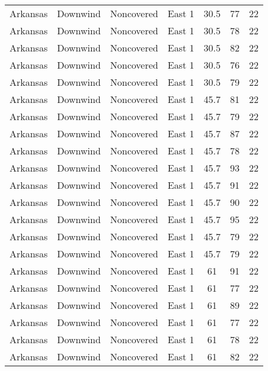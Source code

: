 \documentclass{article}
\begin{document}
\begin{longtable}[H]{ccccccc}
Arkansas & Downwind  & Noncovered & East 1        & 30.5         & 77          & 22  \\
Arkansas & Downwind  & Noncovered & East 1        & 30.5         & 78          & 22  \\
Arkansas & Downwind  & Noncovered & East 1        & 30.5         & 82          & 22  \\
Arkansas & Downwind  & Noncovered & East 1        & 30.5         & 76          & 22  \\
Arkansas & Downwind  & Noncovered & East 1        & 30.5         & 79          & 22  \\
Arkansas & Downwind  & Noncovered & East 1        & 45.7         & 81          & 22  \\
Arkansas & Downwind  & Noncovered & East 1        & 45.7         & 79          & 22  \\
Arkansas & Downwind  & Noncovered & East 1        & 45.7         & 87          & 22  \\
Arkansas & Downwind  & Noncovered & East 1        & 45.7         & 78          & 22  \\
Arkansas & Downwind  & Noncovered & East 1        & 45.7         & 93          & 22  \\
Arkansas & Downwind  & Noncovered & East 1        & 45.7         & 91          & 22  \\
Arkansas & Downwind  & Noncovered & East 1        & 45.7         & 90          & 22  \\
Arkansas & Downwind  & Noncovered & East 1        & 45.7         & 95          & 22  \\
Arkansas & Downwind  & Noncovered & East 1        & 45.7         & 79          & 22  \\
Arkansas & Downwind  & Noncovered & East 1        & 45.7         & 79          & 22  \\
Arkansas & Downwind  & Noncovered & East 1        & 61           & 91          & 22  \\
Arkansas & Downwind  & Noncovered & East 1        & 61           & 77          & 22  \\
Arkansas & Downwind  & Noncovered & East 1        & 61           & 89          & 22  \\
Arkansas & Downwind  & Noncovered & East 1        & 61           & 77          & 22  \\
Arkansas & Downwind  & Noncovered & East 1        & 61           & 78          & 22  \\
Arkansas & Downwind  & Noncovered & East 1        & 61           & 82          & 22  \\

\end{longtable}
\end{document}
